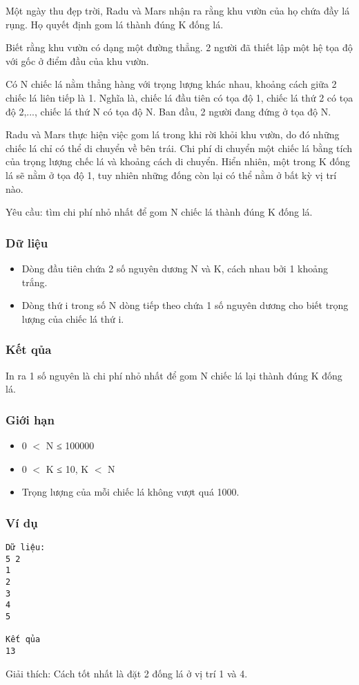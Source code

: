 



   Một ngày thu đẹp trời, Radu và Mars nhận ra rằng khu vườn của họ chứa đầy lá rụng. Họ quyết định gom lá thành đúng K đống lá.  

   Biết rằng khu vườn có dạng một đường thẳng. 2 người đã thiết lập một hệ tọa độ với gốc ở điểm đầu của khu vườn.  

   Có N chiếc lá nằm thẳng hàng với trọng lượng khác nhau, khoảng cách giữa 2 chiếc lá liên tiếp là 1. Nghĩa là, chiếc lá đầu tiên có tọa độ 1, chiếc lá   thứ 2 có tọa độ 2,..., chiếc lá thứ N có tọa độ N. Ban đầu, 2 người đang đứng ở tọa độ N.  

   Radu và Mars thực hiện việc gom lá trong khi rời khỏi khu vườn, do đó những chiếc lá chỉ có thể di chuyển về bên trái. Chi phí di chuyển một chiếc   lá bằng tích của trọng lượng chếc lá và khoảng cách di chuyển. Hiển nhiên, một trong K đống lá sẽ nằm ở tọa độ 1, tuy nhiên những đống còn lại có thể   nằm ở bất kỳ vị trí nào.  

   Yêu cầu: tìm chi phí nhỏ nhất để gom N chiếc lá thành đúng K đống lá.  

\subsubsection{   Dữ liệu  }
\begin{itemize}
	\item     Dòng đầu tiên chứa 2 số nguyên dương N và K, cách nhau bởi 1 khoảng trắng.   
	\item     Dòng thứ i trong số N dòng tiếp theo chứa 1 số nguyên dương cho biết trọng lượng của chiếc lá thứ i.   
\end{itemize}

\subsubsection{   Kết qủa  }

   In ra 1 số nguyên là chi phí nhỏ nhất để gom N chiếc lá lại thành đúng K đống lá.  

\subsubsection{   Giới hạn  }
\begin{itemize}
	\item     0 $<$ N ≤ 100000   
	\item     0 $<$ K ≤ 10, K $<$ N   
	\item     Trọng lượng của mỗi chiếc lá không vượt quá 1000.   
\end{itemize}

\subsubsection{   Ví dụ  }
\begin{verbatim}
Dữ liệu:
5 2
1
2
3
4
5

Kết qủa
13
\end{verbatim}

   Giải thích: Cách tốt nhất là đặt 2 đống lá ở vị trí 1 và 4.  